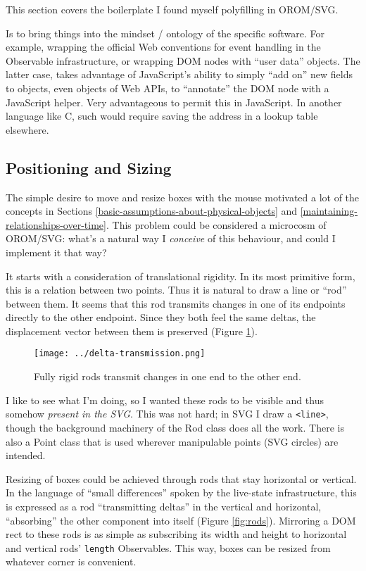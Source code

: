 This section covers the boilerplate I found myself polyfilling in
OROM/SVG.

Is to bring things into the mindset / ontology of the specific software.
For example, wrapping the official Web conventions for event handling in
the Observable infrastructure, or wrapping DOM nodes with ``user data''
objects. The latter case, takes advantage of JavaScript's ability to
simply ``add on'' new fields to objects, even objects of Web APIs, to
``annotate'' the DOM node with a JavaScript helper. Very advantageous to
permit this in JavaScript. In another language like C, such would
require saving the address in a lookup table elsewhere.

\hypertarget{positioning-and-sizing}{%
\subsection{Positioning and Sizing}\label{positioning-and-sizing}}

The simple desire to move and resize boxes with the mouse motivated a
lot of the concepts in Sections
\ref{basic-assumptions-about-physical-objects} and
\ref{maintaining-relationships-over-time}. This problem could be
considered a microcosm of OROM/SVG: what's a natural way I
\emph{conceive} of this behaviour, and could I implement it that way?

It starts with a consideration of translational rigidity. In its most
primitive form, this is a relation between two points. Thus it is
natural to draw a line or ``rod'' between them. It seems that this rod
transmits changes in one of its endpoints directly to the other
endpoint. Since they both feel the same deltas, the displacement vector
between them is preserved (Figure \ref{fig:delta-transmission}).

\begin{figure}[h]
  \centering
  \texttt{[image: ../delta-transmission.png]}
  \caption{Fully rigid rods transmit changes in one end to the other end. \label{fig:delta-transmission}}
\end{figure}

I like to see what I'm doing, so I wanted these rods to be visible and
thus somehow \emph{present in the SVG}. This was not hard; in SVG I draw
a \texttt{\textless{}line\textgreater{}}, though the background
machinery of the Rod class does all the work. There is also a Point
class that is used wherever manipulable points (SVG circles) are
intended.

Resizing of boxes could be achieved through rods that stay horizontal or
vertical. In the language of ``small differences'' spoken by the
live-state infrastructure, this is expressed as a rod ``transmitting
deltas'' in the vertical and horizontal, ``absorbing'' the other
component into itself (Figure \ref{fig:rods}). Mirroring a DOM rect to
these rods is as simple as subscribing its width and height to
horizontal and vertical rods' \texttt{length} Observables. This way,
boxes can be resized from whatever corner is convenient.

